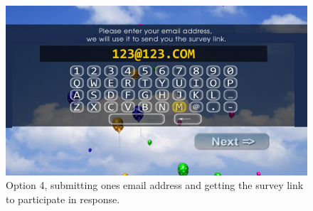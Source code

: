     \begin{figure}
        \begin{center}
            \includegraphics[width=\columnwidth]{img/screenshots/option-email.jpg}
        \end{center}
     \caption{Option 4, submitting ones email address and getting the survey link to participate in response.}
     \label{screenshot:email-option}
    \end{figure}